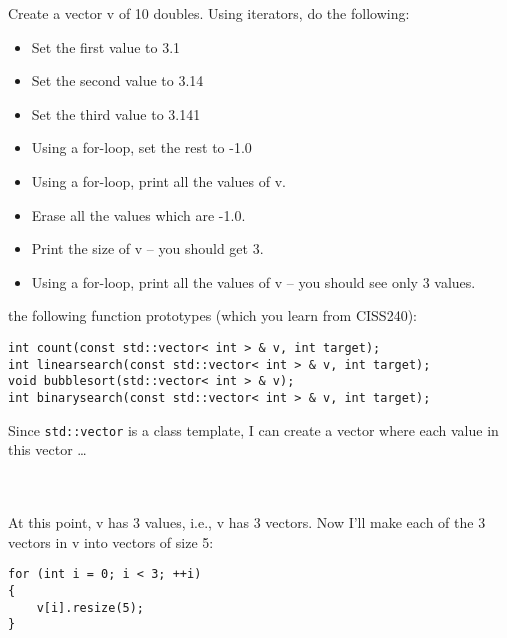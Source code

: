 \begin{ex} Create a vector v of 10 doubles. Using iterators, do
the following:

\begin{itemize}
\item
  Set the first value to 3.1
\item
  Set the second value to 3.14
\item
  Set the third value to 3.141
\item
  Using a for-loop, set the rest to -1.0
\item
  Using a for-loop, print all the values of v.
\item
  Erase all the values which are -1.0.
\item
  Print the size of v -- you should get 3.
\item
  Using a for-loop, print all the values of v -- you should see only 3
  values.
\end{itemize}
\end{ex}
\begin{ex} the following function prototypes (which
you learn from CISS240):

\verb!int count(const std::vector< int > & v, int target);!\\
\verb!int linearsearch(const std::vector< int > & v, int target);!\\
\verb!void bubblesort(std::vector< int > & v);!\\
\verb!int binarysearch(const std::vector< int > & v, int target);!\\

\end{ex}
\newpage{}

Since \texttt{std::vector} is a class template, I can create a vector where each value in this vector \ldots {}

\\
\\

At this point, v has 3 values, i.e., v has 3 vectors. Now I'll make each
of the 3 vectors in v into vectors of size 5:

\verb!for (int i = 0; i < 3; ++i)!\\
\verb!{!\\            
\verb!    v[i].resize(5);!\\
\verb!}!\\

